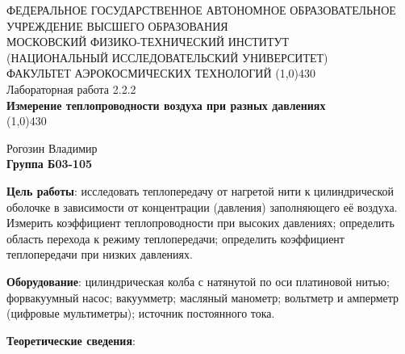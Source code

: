 \documentclass[a4paper,12pt]{article}
\begin{document}
\begin{titlepage}
\begin{center}
\large{\small ФЕДЕРАЛЬНОЕ ГОСУДАРСТВЕННОЕ АВТОНОМНОЕ ОБРАЗОВАТЕЛЬНОЕ\\ УЧРЕЖДЕНИЕ ВЫСШЕГО ОБРАЗОВАНИЯ \\ МОСКОВСКИЙ ФИЗИКО-ТЕХНИЧЕСКИЙ ИНСТИТУТ\\ (НАЦИОНАЛЬНЫЙ ИССЛЕДОВАТЕЛЬСКИЙ УНИВЕРСИТЕТ)\\ ФАКУЛЬТЕТ АЭРОКОСМИЧЕСКИХ ТЕХНОЛОГИЙ}
\vfill
\line(1,0){430}\\[1mm]
\huge{Лабораторная работа 2.2.2}\\
\huge\textbf{Измерение теплопроводности воздуха при разных давлениях}\\
\line(1,0){430}\\[1mm]
\vfill
\begin{flushright}
\normalsize{Рогозин Владимир}\\
\normalsize{\textbf{Группа Б03-105}}\\
\end{flushright}
\end{center}
\end{titlepage}


\textbf{Цель работы}: исследовать теплопередачу от нагретой нити к цилиндрической оболочке в зависимости от концентрации (давления) заполняющего её воздуха. Измерить коэффициент теплопроводности при высоких давлениях; определить область перехода к режиму теплопередачи; определить коэффициент теплопередачи при низких давлениях.

\textbf{Оборудование}: цилиндрическая колба с натянутой по оси платиновой нитью; форвакуумный насос; вакуумметр; масляный манометр; вольтметр и амперметр
(цифровые мультиметры); источник постоянного тока.

\textbf{Теоретические сведения}: 
\end{document}
